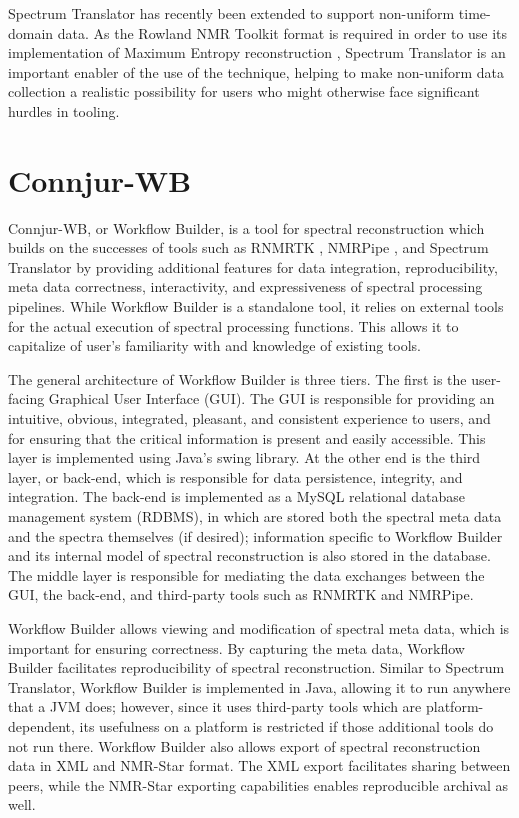 Spectrum Translator has recently been extended to support non-uniform time-domain
data.  As the Rowland NMR Toolkit format is required in order to use its 
implementation of Maximum Entropy reconstruction \cite{rnmrtk}, Spectrum
Translator is an important enabler of the use of the technique, helping to 
make non-uniform data collection a realistic possibility for users who might
otherwise face significant hurdles in tooling.


\section{Connjur-WB}
Connjur-WB, or Workflow Builder, is a tool for spectral reconstruction which
builds on the successes of tools such as RNMRTK \cite{rnmrtk}, NMRPipe \cite{nmrpipe},
and Spectrum Translator \cite{connjur-st} by providing additional features
for data integration, reproducibility, meta data correctness, interactivity,
and expressiveness of spectral processing pipelines.  While Workflow Builder
is a standalone tool, it relies on external tools for the actual execution of
spectral processing functions.  This allows it to capitalize of user's 
familiarity with and knowledge of existing tools.

The general architecture of Workflow Builder is three tiers.  The first is 
the user-facing Graphical User Interface (GUI).  The GUI is responsible for
providing an intuitive, obvious, integrated, pleasant, and consistent experience
to users, and for ensuring that the critical information is present and easily
accessible.  This layer is implemented using Java's swing library.
At the other end is the third layer, or back-end, which is
responsible for data persistence, integrity, and integration.  The back-end
is implemented as a MySQL relational database management system (RDBMS), in
which are stored both the spectral meta data and the spectra themselves (if
desired); information specific to Workflow Builder and its internal model
of spectral reconstruction is also stored in the database.  The middle layer
is responsible for mediating the data exchanges between the GUI, the back-end,
and third-party tools such as RNMRTK and NMRPipe.

Workflow Builder allows viewing and modification of spectral meta data, which 
is important for ensuring correctness.  By capturing the meta data, Workflow
Builder facilitates reproducibility of spectral reconstruction.  Similar to
Spectrum Translator, Workflow Builder is implemented in Java, allowing it to
run anywhere that a JVM does; however, since it uses third-party tools which 
are platform-dependent, its usefulness on a platform is restricted if those
additional tools do not run there.  Workflow Builder also allows export of
spectral reconstruction data in XML and NMR-Star format.  The XML export
facilitates sharing between peers, while the NMR-Star exporting capabilities
enables reproducible archival as well.

